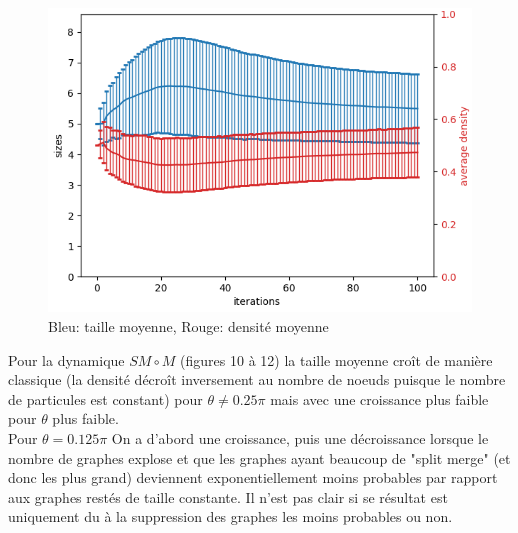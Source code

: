 \documentclass[11pts,french]{article}
\begin{document}
\begin{figure}[h!]
\begin{minipage}{0.33\textwidth}
\caption{$SM\circ M$, $\theta=0.25\pi$}
\end{minipage}
\begin{minipage}{0.33\textwidth}
\centering
\includegraphics[width=\textwidth, height=0.66\textwidth]{sizes/2_split_merge_move}
\caption{$SM\circ M$, $\theta=0.125\pi$}
\end{minipage}

\captionsetup{labelformat=empty}
\caption{Bleu: taille moyenne, Rouge: densité moyenne}

\end{figure}

Pour la dynamique $SM \circ M$ (figures 10 à 12) la taille moyenne croît de manière classique (la densité décroît inversement au nombre de noeuds puisque le nombre de particules est constant) pour $\theta \neq 0.25\pi$ mais avec une croissance plus faible pour $\theta$ plus faible. \\

Pour $\theta = 0.125\pi$ On a d'abord une croissance, puis une décroissance lorsque le nombre de graphes explose et que les graphes ayant beaucoup de "split merge" (et donc les plus grand) deviennent exponentiellement moins probables par rapport aux graphes restés de taille constante. Il n'est pas clair si se résultat est uniquement du à la suppression des graphes les moins probables ou non. \\
\end{document}
